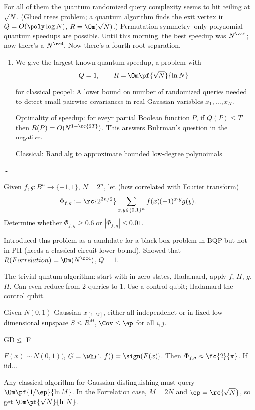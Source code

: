 For all of them the quantum randomized query complexity seems to hit  ceiling at $\sqrt N$. (Glued trees problem; a quantum algorithm finds the exit vertex in $Q=O(\poly\log N)$, $R=\Om(\sqrt N)$.) Permutation symmetry: only polynomial quantum speedups are possible. Until this morning, the best speedup was $N^{\rc2}$; now there's a $N^{\rc 4}$. Now there's a fourth root separation.
\begin{enumerate}
\item

We give the largest known quantum speedup, a problem with
\[
Q=1,\qquad R=\Om\pf{\sqrt N}{\ln N}
\]

for classical peopel:
A lower bound on number of randomized queries needed to detect small pairwise covariances in real Gaussian variables $x_1,\ldots, x_N$.

Optimality of speedup: for eveyr partial Boolean function $P$, if $Q(P)\le T$ then $R(P)=O(N^{1-\rc{2T}})$.
This answers Buhrman's question in the negative.

Classical:
Rand alg to approximate bounded low-degree polynoimals.
\end{enumerate}•
\begin{prb}
Given $f,g:B^n\to \{-1,1\}$, $N=2^n$, let (how correlated with Fourier transform)
\[
\Phi_{f,g} := \rc{2^{3n/2}} \sum_{x,y\in \{0,1\}^n} f(x)(-1)^{x\cdot y}g(y).
\]
Determine whether $\Phi_{f,g}\ge 0.6$ or $|\Phi_{f,g}|\le 0.01$.
\end{prb}
Introduced this problem as a candidate for a black-box problem in BQP but not in PH (needs a classical circuit lower bound). Showed that $R(Forrelation)=\Om(N^{\rc 4})$, $Q=1$.

The trivial quntum algorithm: start with in zero states, Hadamard, apply $f$, $H$, $g$, $H$. Can even reduce from 2 queries to 1. Use a control qubit; Hadamard the control qubit.

\begin{prb}
Given $N(0,1)$ Gaussian $x_{[1,M]}$, either all independenct or in fixed low-dimensional supspace $S\le R^M$, $\Cov\le \ep$ for all $i,j$.
\end{prb}

GD$\le$ F

$F(x)\sim N(0,1))$, $G=\wh F$.
$f()=\sign(F(x))$. Then $\Phi_{f,g}\approx \fc{2}{\pi}$. If iid...

Any classical algorithm for Gaussian distinguishing must query $\Om\pf{1/\ep}{\ln M}$. In the Forrelation case, $M=2N$ and $\ep=\rc{\sqrt N}$, so get $\Om\pf{\sqrt N}{\ln N}$.

